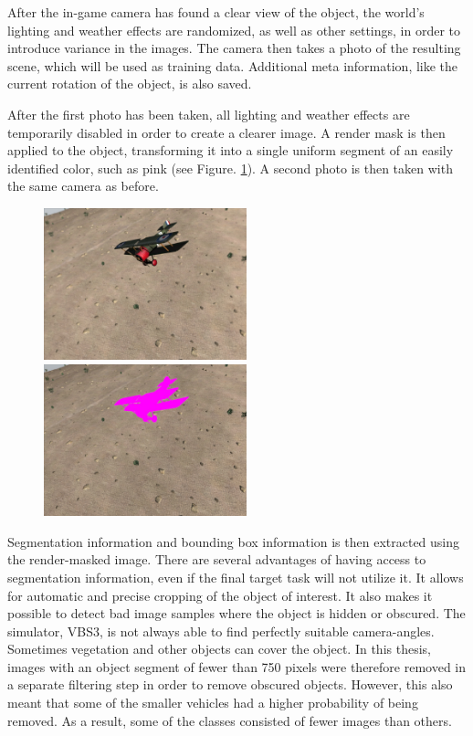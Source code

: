After the in-game camera has found a clear view of the object, the world's lighting and weather effects are randomized, as well as other settings, in order to introduce variance in the images. The camera then takes a photo of the resulting scene, which will be used as training data. Additional meta information, like the current rotation of the object, is also saved. 

After the first photo has been taken, all lighting and weather effects are temporarily disabled in order to create a clearer image. A render mask is then applied to the object, transforming it into a single uniform segment of an easily identified color, such as pink (see Figure. \ref{fig:rendermask}). A second photo is then taken with the same camera as before.

\begin{figure}[H]
\centering
{}
  {\includegraphics[height=4.4cm]{images/vbs3/bbox/example2.jpg}}
%
  {\includegraphics[height=4.4cm]{images/vbs3/bbox/example2-pink.jpg}}
\caption{}
\label{fig:rendermask}
\end{figure}

Segmentation information and bounding box information is then extracted using the render-masked image. There are several advantages of having access to segmentation information, even if the final target task will not utilize it. It allows for automatic and precise cropping of the object of interest. It also makes it possible to detect bad image samples where the object is hidden or obscured. The simulator, \gls{VBS3}, is not always able to find perfectly suitable camera-angles. Sometimes vegetation and other objects can cover the object. In this thesis, images with an object segment of fewer than 750 pixels were therefore removed in a separate filtering step in order to remove obscured objects. However, this also meant that some of the smaller vehicles had a higher probability of being removed. As a result, some of the classes consisted of fewer images than others.

